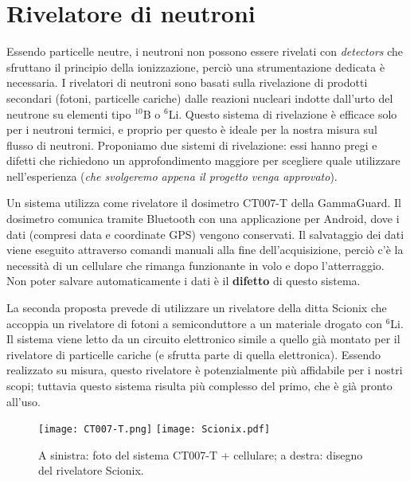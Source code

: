\section{Rivelatore di neutroni}
Essendo particelle neutre, i neutroni non possono essere rivelati con \emph{detectors} che sfruttano il principio della ionizzazione, perciò una strumentazione dedicata è necessaria. I rivelatori di neutroni sono basati sulla rivelazione di prodotti secondari (fotoni, particelle cariche) dalle reazioni nucleari indotte dall'urto del neutrone su elementi tipo $^{10}$B o $^6$Li. Questo sistema di rivelazione è efficace solo per i neutroni termici, e proprio per questo è ideale per la nostra misura sul flusso di neutroni. Proponiamo due sistemi di rivelazione: essi hanno pregi e difetti che richiedono un approfondimento maggiore per scegliere quale utilizzare nell'esperienza (\emph{che svolgeremo appena il progetto venga approvato}). 

Un sistema utilizza come rivelatore il dosimetro CT007-T della GammaGuard. Il dosimetro comunica tramite Bluetooth con una applicazione per Android, dove i dati (compresi data e coordinate GPS) vengono conservati. Il salvataggio dei dati viene eseguito attraverso comandi manuali alla fine dell'acquisizione, perciò c'è la necessità di un cellulare che rimanga funzionante in volo e dopo l'atterraggio. Non poter salvare automaticamente i dati è il \textbf{difetto} di questo sistema.

La seconda proposta prevede di utilizzare un rivelatore della ditta Scionix che accoppia un rivelatore di fotoni a semiconduttore a un materiale drogato con $^6$Li. Il sistema viene letto da un circuito elettronico simile a quello già montato per il rivelatore di particelle cariche (e sfrutta parte di quella elettronica). Essendo realizzato su misura, questo rivelatore è potenzialmente più affidabile per i nostri scopi; tuttavia questo sistema risulta più complesso del primo, che è già pronto all'uso. 

\begin{figure}
    \centering
    \texttt{[image: CT007-T.png]}
    \quad
    \texttt{[image: Scionix.pdf]}
    \caption{A sinistra: foto del sistema CT007-T + cellulare; a destra: disegno del rivelatore Scionix.}
    \label{fig:my_label}
\end{figure}
